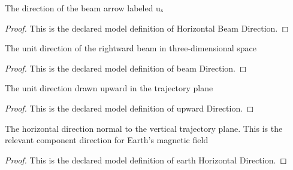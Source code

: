 \begin{definition}
  \label{def:physics:phyx-mini-0561:phyxminiproblems-problemphyxmini0561-horizontalbeamdirection}
  The direction of the beam arrow labeled uₓ
\end{definition}
\begin{proof}
  This is the declared model definition of Horizontal Beam Direction.
\end{proof}
\begin{definition}
  \label{def:physics:phyx-mini-0561:phyxminiproblems-problemphyxmini0561-beamdirection}
  The unit direction of the rightward beam in three-dimensional space
\end{definition}
\begin{proof}
  This is the declared model definition of beam Direction.
\end{proof}
\begin{definition}
  \label{def:physics:phyx-mini-0561:phyxminiproblems-problemphyxmini0561-upwarddirection}
  The unit direction drawn upward in the trajectory plane
\end{definition}
\begin{proof}
  This is the declared model definition of upward Direction.
\end{proof}
\begin{definition}
  \label{def:physics:phyx-mini-0561:phyxminiproblems-problemphyxmini0561-earthhorizontaldirection}
  The horizontal direction normal to the vertical trajectory plane. This is the relevant component direction for Earth's magnetic field
\end{definition}
\begin{proof}
  This is the declared model definition of earth Horizontal Direction.
\end{proof}
